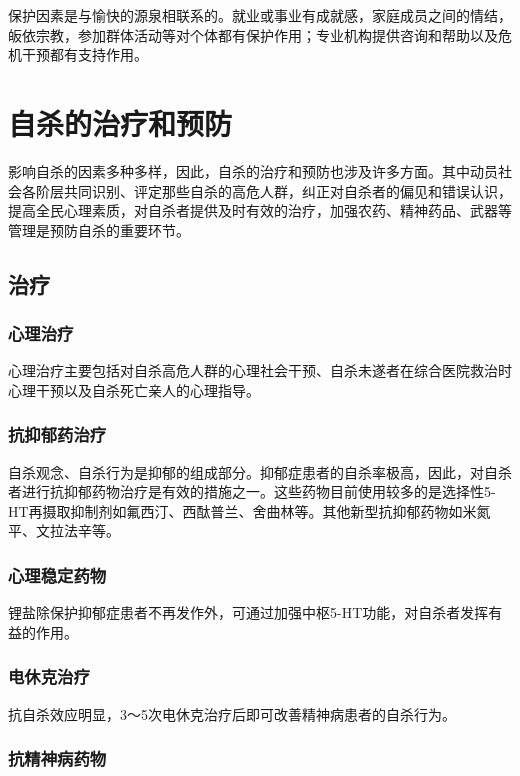 保护因素是与愉快的源泉相联系的。就业或事业有成就感，家庭成员之间的情结，皈依宗教，参加群体活动等对个体都有保护作用；专业机构提供咨询和帮助以及危机干预都有支持作用。

\section{自杀的治疗和预防}

影响自杀的因素多种多样，因此，自杀的治疗和预防也涉及许多方面。其中动员社会各阶层共同识别、评定那些自杀的高危人群，纠正对自杀者的偏见和错误认识，提高全民心理素质，对自杀者提供及时有效的治疗，加强农药、精神药品、武器等管理是预防自杀的重要环节。

\subsection{治疗}

\subsubsection{心理治疗}

心理治疗主要包括对自杀高危人群的心理社会干预、自杀未遂者在综合医院救治时心理干预以及自杀死亡亲人的心理指导。

\subsubsection{抗抑郁药治疗}

自杀观念、自杀行为是抑郁的组成部分。抑郁症患者的自杀率极高，因此，对自杀者进行抗抑郁药物治疗是有效的措施之一。这些药物目前使用较多的是选择性5-HT再摄取抑制剂如氟西汀、西酞普兰、舍曲林等。其他新型抗抑郁药物如米氮平、文拉法辛等。

\subsubsection{心理稳定药物}

锂盐除保护抑郁症患者不再发作外，可通过加强中枢5-HT功能，对自杀者发挥有益的作用。

\subsubsection{电休克治疗}

抗自杀效应明显，3～5次电休克治疗后即可改善精神病患者的自杀行为。

\subsubsection{抗精神病药物}

